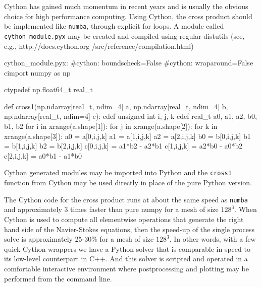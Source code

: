 \documentclass[11pt, oneside]{article}
\newcommand{\inpyth}{\lstinline[style=pythonstyle, basicstyle=\ttfamily]} %[]%
\begin{document}
Cython has gained much momentum in recent years and is usually the obvious choice for high performance computing. Using Cython, the cross product should be implemented like \inpyth{numba}, through explicit for loops. A module called \inpyth{cython_module.pyx} may be created and compiled using regular distutils (see, e.g., http://docs.cython.org /src/reference/compilation.html)
\begin{python}
cython_module.pyx:
#cython: boundscheck=False
#cython: wraparound=False
cimport numpy as np

ctypedef np.float64_t real_t

def cross1(np.ndarray[real_t, ndim=4] a,
           np.ndarray[real_t, ndim=4] b,
           np.ndarray[real_t, ndim=4] c):
    cdef unsigned int i, j, k
    cdef real_t a0, a1, a2, b0, b1, b2
    for i in xrange(a.shape[1]):
        for j in xrange(a.shape[2]):
            for k in xrange(a.shape[3]):
                a0 = a[0,i,j,k]
                a1 = a[1,i,j,k]
                a2 = a[2,i,j,k]
                b0 = b[0,i,j,k]
                b1 = b[1,i,j,k]
                b2 = b[2,i,j,k]
                c[0,i,j,k] = a1*b2 - a2*b1
                c[1,i,j,k] = a2*b0 - a0*b2
                c[2,i,j,k] = a0*b1 - a1*b0

\end{python}
Cython generated modules may be imported into Python and the \inpyth{cross1} function from Cython may be used directly in place of the pure Python version. 

The Cython code for the cross product runs at about the same speed as \inpyth{numba} and approximately 3 times faster than pure numpy for a mesh of size $128^3$. When Cython is used to compute all elementwise operations that generate the right hand side of the Navier-Stokes equations, then the speed-up of the single process solve is approximately 25-30\% for a mesh of size $128^3$. In other words, with a few quick Cython wrappers we have a Python solver that is comparable in speed to its low-level counterpart in C++. And this solver is scripted and operated in a comfortable interactive environment where postprocessing and plotting may be performed from the command line.
\end{document}
